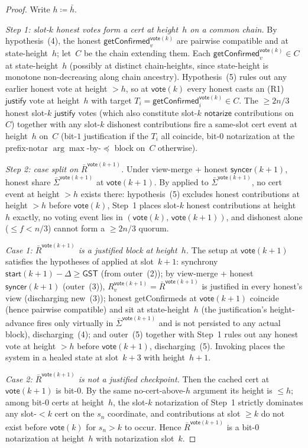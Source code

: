 \ifx\litemode\undefined\documentclass{article}\fi
\newcommand{\just}{\ensuremath{\mathsf{justify}}\xspace}
\newcommand{\notar}{\ensuremath{\mathsf{notarize}}\xspace}
\newcommand{\syncer}{\mathsf{syncer}}
\newcommand{\start}{\mathsf{start}}
\newcommand{\vote}{\mathsf{vote}}
\newcommand{\comm}[1]{\bar{#1}}
\newcommand{\getConfirmed}{\textsf{getConfirmed}\xspace}
\theoremstyle{plain}
\theoremstyle{definition}
\theoremstyle{remark}
\newcommand{\GST}{\ensuremath{\mathsf{GST}}}
\begin{document}
\begin{proof}
Write $h \coloneqq \comm{h}$.

\emph{Step 1: slot-$k$ honest votes form a cert at height~$h$ on a common chain.}
By hypothesis~(4), the honest $\getConfirmed_v^{\vote(k)}$ are pairwise compatible and at state-height~$h$; let~$C$ be the chain extending them. Each $\getConfirmed_v^{\vote(k)} \in C$ at state-height~$h$ (possibly at distinct chain-heights, since state-height is monotone non-decreasing along chain ancestry). Hypothesis~(5) rules out any earlier honest vote at height $>h$, so at $\vote(k)$ every honest casts an (R1) \just vote at height~$h$ with target $T_i = \getConfirmed_i^{\vote(k)} \in C$. The $\geq 2n/3$ honest slot-$k$ \just votes (which also constitute slot-$k$ \notar contributions on~$C$) together with any slot-$k$ dishonest contributions fire a same-slot cert event at height~$h$ on~$C$ (bit-$1$ justification if the $T_i$ all coincide, bit-$0$ notarization at the prefix-notar $\arg\max$-by-$\preceq$ block on~$C$ otherwise).

\emph{Step 2: case split on $\comm{R}^{\vote(k+1)}$.}
Under view-merge + honest $\syncer(k+1)$, honest share $\comm{\Sigma}^{\vote(k+1)}$ at $\vote(k+1)$. By  applied to $\comm{\Sigma}^{\vote(k+1)}$, no cert event at height $>h$ exists there: hypothesis~(5) excludes honest contributions at height $>h$ before $\vote(k)$, Step~1 places slot-$k$ honest contributions at height~$h$ exactly, no voting event lies in $(\vote(k),\, \vote(k+1))$, and dishonest alone ($\leq f < n/3$) cannot form a $\geq 2n/3$ quorum.

\emph{Case 1: $\comm{R}^{\vote(k+1)}$ is a justified block at height~$h$.}
The setup at $\vote(k+1)$ satisfies the hypotheses of  applied at slot~$k+1$: synchrony $\start(k+1) - \Delta \geq \GST$ (from outer~(2)); by view-merge + honest $\syncer(k+1)$ (outer~(3)), $R_v^{\vote(k+1)} = \comm{R}^{\vote(k+1)}$ is justified in every honest's view (discharging new~(3)); honest \getConfirmed{}s at $\vote(k+1)$ coincide (hence pairwise compatible) and sit at state-height~$h$ (the justification's height-advance fires only virtually in $\comm{\Sigma}^{\vote(k+1)}$ and is not persisted to any actual block), discharging~(4); and outer~(5) together with Step~1 rules out any honest vote at height $>h$ before $\vote(k+1)$, discharging~(5). Invoking  places the system in a healed state at slot~$k+3$ with height~$h+1$.

\emph{Case 2: $\comm{R}^{\vote(k+1)}$ is not a justified checkpoint.}
Then the cached cert at $\vote(k+1)$ is bit-$0$. By the same no-cert-above-$h$ argument its height is $\leq h$; among bit-$0$ certs at height~$h$, the slot-$k$ notarization of Step~1 strictly dominates any slot-$<k$ cert on the $s_n$ coordinate, and contributions at slot $\geq k$ do not exist before $\vote(k)$ for $s_n > k$ to occur. Hence $\comm{R}^{\vote(k+1)}$ is a bit-$0$ notarization at height~$h$ with notarization slot~$k$.


\end{proof}
\end{document}
